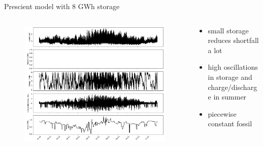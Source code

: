 \documentclass[aspectratio=169,11pt]{beamer}
\begin{document}
\begin{frame}{Prescient model with $8$ GWh storage}
\begin{columns}
    \begin{column}{0.6\textwidth}
        \begin{figure}
            \centering
            \includegraphics[width=\columnwidth]{./figures/hourly_profiles.pdf}
        \end{figure}
    \end{column}
    \begin{column}{0.4\textwidth}
        \begin{itemize}
            \item small storage reduces shortfall a lot
            \item high oscillations in storage and charge/discharge in summer
            \item piecewise constant fossil
        \end{itemize}
    \end{column}
\end{columns}
\end{frame}
\end{document}
